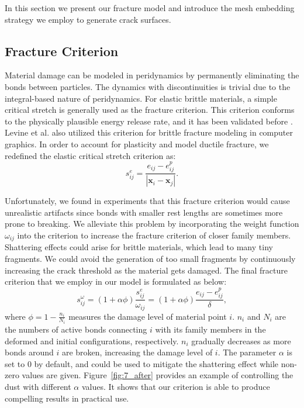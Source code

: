 In this section we present our fracture model and introduce the mesh embedding strategy we employ to generate crack surfaces.

\subsection{Fracture Criterion}

Material damage can be modeled in peridynamics by permanently eliminating the bonds between particles. The dynamics with discontinuities is trivial due to the integral-based nature of peridynamics. For elastic brittle materials, a simple critical stretch is generally used as the fracture criterion. This criterion conforms to the physically plausible energy release rate, and it has been validated before \cite{Silling2005}. Levine et al.\cite{Levine:2015:PPS:2849517.2849526} also utilized this criterion for brittle fracture modeling in computer graphics. In order to account for plasticity and model ductile fracture, we redefined the elastic critical stretch criterion as:
\begin{equation}
s_{ij}^e =\frac{e_{ij}-e_{ij}^p}{|\mathbf{x}_i-\mathbf{x}_j|}.
\label{eq:17}
\end{equation}

Unfortunately, we found in experiments that this fracture criterion would cause unrealistic artifacts since bonds with smaller rest lengths are sometimes more prone to breaking. We alleviate this problem by incorporating the weight function $\omega_{ij}$ into the criterion to increase the fracture criterion of closer family members. Shattering effects could arise for brittle materials, which lead to many tiny fragments. We could avoid the generation of too small fragments by continuously increasing the crack threshold as the material gets damaged. The final fracture criterion that we employ in our model is formulated as below:
\begin{equation}
s_{ij}^\omega = (1 + \alpha\phi)\frac{s_{ij}^e}{\omega_{ij}} = (1 + \alpha\phi)\frac{e_{ij}-e_{ij}^p}{\delta},
\label{eq:18}
\end{equation}
where $\phi = 1 - \frac{n_i}{N_i}$ measures the damage level of material point $i$. $n_i$ and $N_i$ are the numbers of active bonds connecting $i$ with its family members in the deformed and initial configurations, respectively. $n_i$ gradually decreases as more bonds around $i$ are broken, increasing the damage level of $i$. The parameter $\alpha$ is set to 0 by default, and could be used to mitigate the shattering effect while non-zero values are given.
Figure~\ref{fig:7_after} provides an example of controlling the dust with different $\alpha$ values.
It shows that our criterion is able to produce compelling results in practical use.

